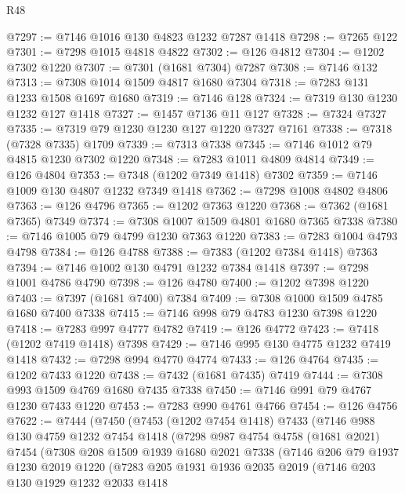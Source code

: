 \begin{lexlean}{R48}
\begin{coremodule}
@7297 := @7146 @1016 @130 @4823 @1232 @7287 @1418
@7298 := @7265 @122
@7301 := @7298 @1015 @4818 @4822
@7302 := @126 @4812
@7304 := @1202 @7302 @1220
@7307 := @7301 (@1681 @7304) @7287
@7308 := @7146 @132
@7313 := @7308 @1014 @1509 @4817 @1680 @7304
@7318 := @7283 @131 @1233 @1508 @1697 @1680
@7319 := @7146 @128
@7324 := @7319 @130 @1230 @1232 @127 @1418
@7327 := @1457 @7136 @11 @127
@7328 := @7324 @7327
@7335 := @7319 @79 @1230 @1230 @127 @1220 @7327 @7161
@7338 := @7318 (@7328 @7335) @1709
@7339 := @7313 @7338
@7345 := @7146 @1012 @79 @4815 @1230 @7302 @1220
@7348 := @7283 @1011 @4809 @4814
@7349 := @126 @4804
@7353 := @7348 (@1202 @7349 @1418) @7302
@7359 := @7146 @1009 @130 @4807 @1232 @7349 @1418
@7362 := @7298 @1008 @4802 @4806
@7363 := @126 @4796
@7365 := @1202 @7363 @1220
@7368 := @7362 (@1681 @7365) @7349
@7374 := @7308 @1007 @1509 @4801 @1680 @7365 @7338
@7380 := @7146 @1005 @79 @4799 @1230 @7363 @1220
@7383 := @7283 @1004 @4793 @4798
@7384 := @126 @4788
@7388 := @7383 (@1202 @7384 @1418) @7363
@7394 := @7146 @1002 @130 @4791 @1232 @7384 @1418
@7397 := @7298 @1001 @4786 @4790
@7398 := @126 @4780
@7400 := @1202 @7398 @1220
@7403 := @7397 (@1681 @7400) @7384
@7409 := @7308 @1000 @1509 @4785 @1680 @7400 @7338
@7415 := @7146 @998 @79 @4783 @1230 @7398 @1220
@7418 := @7283 @997 @4777 @4782
@7419 := @126 @4772
@7423 := @7418 (@1202 @7419 @1418) @7398
@7429 := @7146 @995 @130 @4775 @1232 @7419 @1418
@7432 := @7298 @994 @4770 @4774
@7433 := @126 @4764
@7435 := @1202 @7433 @1220
@7438 := @7432 (@1681 @7435) @7419
@7444 := @7308 @993 @1509 @4769 @1680 @7435 @7338
@7450 := @7146 @991 @79 @4767 @1230 @7433 @1220
@7453 := @7283 @990 @4761 @4766
@7454 := @126 @4756
@7622 := @7444
    (@7450
      (@7453
        (@1202 @7454 @1418)
        @7433
        (@7146
          @988
          @130
          @4759
          @1232
          @7454
          @1418
          (@7298
            @987
            @4754
            @4758
            (@1681 @2021)
            @7454
            (@7308
              @208
              @1509
              @1939
              @1680
              @2021
              @7338
              (@7146
                @206
                @79
                @1937
                @1230
                @2019
                @1220
                (@7283
                  @205
                  @1931
                  @1936
                  @2035
                  @2019
                  (@7146
                    @203
                    @130
                    @1929
                    @1232
                    @2033
                    @1418

\end{coremodule}
\end{lexlean}
